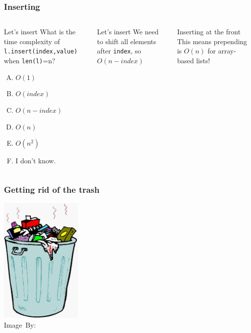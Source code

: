 \begin{frame}
	\frametitle{Inserting}
	\begin{columns}

		\begin{block}{Let's insert}
			What is the time complexity of \texttt{l.insert(index,value)} when \texttt{len(l)}=n?
			\begin{enumerate}[A.]
				\item $O(1)$
				\item $O(\textit{index})$
				\item $O(n - \textit{index})$
				\item $O(n)$
				\item $O(n^2)$
				\item I don't know.
			\end{enumerate}
		\end{block}
		\pause
		\begin{block}{Let's insert}
			We need to shift all elements after \texttt{index}, so $O(n-\textit{index})$
		\end{block}
		\pause
		\begin{block}{Inserting at the front}
			This means prepending is $O(n)$ for array-based lists!
		\end{block}	
	\end{columns}
\end{frame}

\begin{frame}
	\frametitle{Getting rid of the trash}
	\begin{center}
		\includegraphics[width=0.3\textwidth]{images/trash.jpg}\\
		\hspace*{15pt}\hbox{\scriptsize Image By:}
	\end{center}
\end{frame}

